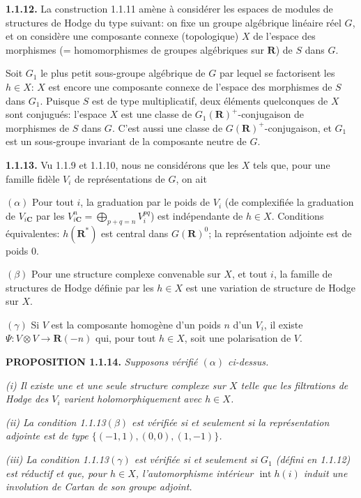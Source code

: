 \documentclass[10pt,a4paper]{article}
\begin{document}
\textbf{1.1.12.} La construction 1.1.11 amène à considérer les espaces de modules de structures de Hodge du type suivant: on fixe un groupe algébrique linéaire réel \(G\), et on considère une composante connexe (topologique) \(X\) de l'espace des morphismes (= homomorphismes de groupes algébriques sur \(\mathbf R\)) de \(S\) dans \(G\).

Soit \(G_1\) le plus petit sous-groupe algébrique de \(G\) par lequel se factorisent les \(h\in X\): \(X\) est encore une composante connexe de l'espace des morphismes de \(S\) dans \(G_1\). Puisque \(S\) est de type multiplicatif, deux éléments quelconques de \(X\) sont conjugués: l'espace \(X\) est une classe de \(G_1(\mathbf R)^+\)-conjugaison de morphismes de \(S\) dans \(G\). C'est aussi une classe de \(G(\mathbf R)^+\)-conjugaison, et \(G_1\) est un sous-groupe invariant de la composante neutre de \(G\).

\textbf{1.1.13.} Vu 1.1.9 et 1.1.10, nous ne considérons que les \(X\) tels que, pour une famille fidèle \(V_i\) de représentations de \(G\), on ait

\((\alpha)\) Pour tout \(i\), la graduation par le poids de \(V_i\) (de complexifiée la graduation de \(V_{i\mathbf C}\) par les \(V_{i\mathbf C}^n=\bigoplus_{p+q=n}V_i^{pq}\)) est indépendante de \(h\in X\). Conditions équivalentes: \(h(\mathbf R^*)\) est central dans \(G(\mathbf R)^0\); la représentation adjointe est de poids 0.

\((\beta)\) Pour une structure complexe convenable sur \(X\), et tout \(i\), la famille de structures de Hodge définie par les \(h\in X\) est une variation de structure de Hodge sur \(X\).

\((\gamma)\) Si \(V\) est la composante homogène d'un poids \(n\) d'un \(V_i\), il existe \(\Psi:V\otimes V\to\mathbf R(-n)\) qui, pour tout \(h\in X\), soit une polarisation de \(V\).

\textbf{PROPOSITION 1.1.14.} \emph{Supposons vérifié \((\alpha)\) ci-dessus.}

\emph{(i) Il existe une et une seule structure complexe sur \(X\) telle que les filtrations de Hodge des \(V_i\) varient holomorphiquement avec \(h\in X\).}

\emph{(ii) La condition 1.1.13\((\beta)\) est vérifiée si et seulement si la représentation adjointe est de type \(\{(-1,1),(0,0),(1,-1)\}\).}

\emph{(iii) La condition 1.1.13\((\gamma)\) est vérifiée si et seulement si \(G_1\) (défini en 1.1.12) est réductif et que, pour \(h\in X\), l'automorphisme intérieur \(\operatorname{int}h(i)\) induit une involution de Cartan de son groupe adjoint.}
\end{document}
